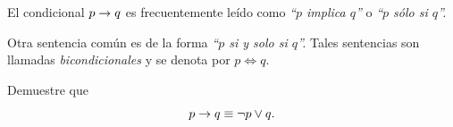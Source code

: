  El condicional $p \rightarrow q$ es frecuentemente leído como \emph{``$p$ implica $q$''} o \emph{``$p$ sólo si $q$''.}



 Otra sentencia común es de la forma \emph{``$p$ si y solo si $q$''.}  Tales sentencias son llamadas \emph{bicondicionales} y se denota por
 $
 p \iff q.
 $ 







 \begin{resuelto}
  Demuestre que $$p\rightarrow q \equiv \neg p \vee q.$$
 \end{resuelto}




